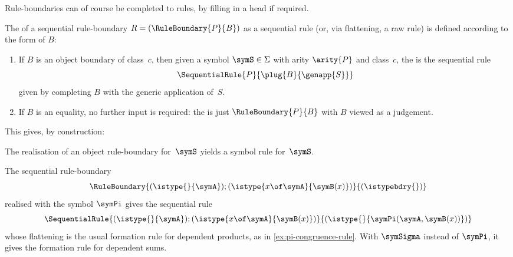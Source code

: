 Rule-boundaries can of course be completed to rules, by filling in a head if required.

\begin{definition}
  \label{def:rule-boundary-realisation}%
  The  of a sequential rule-boundary $R = (\RuleBoundary{P}{B})$ as a sequential rule (or, via flattening, a raw rule) is
  defined according to the form of $B$:
  \begin{enumerate}
  \item
    If $B$ is an object boundary of class~$c$, then given a symbol $\symS \in \Sigma$ with arity $\arity{P}$ and class~$c$, the  is the sequential rule
    \begin{equation*}
      \SequentialRule
      {P}
      {\plug{B}{\genapp{S}}}
    \end{equation*}
    given by completing $B$ with the generic application of~$S$.

    \item
    If $B$ is an equality, no further input is required: the  is just $\RuleBoundary{P}{B}$ with $B$ viewed as a judgement.
\end{enumerate}
\end{definition}

This gives, by construction:

\begin{propositionwithqed}
  The realisation of an object rule-boundary for~$\symS$ yields a symbol rule for~$\symS$.
\end{propositionwithqed}

\begin{example}
  The sequential rule-boundary
  \begin{equation*}
    \RuleBoundary{
      (\istype{}{\symA}) ;
      (\istype{x \of \symA}{\symB(x)})
    }{
      (\istypebdry{})
    }
  \end{equation*}
  realised with the symbol $\symPi$ gives the sequential rule
  \begin{equation*}
    \SequentialRule{
      (\istype{}{\symA}) ;
      (\istype{x \of \symA}{\symB(x)})
    }{
      (\istype{}{\symPi(\symA, \symB(x))})
    }
  \end{equation*}
  whose flattening is the usual formation rule for dependent products, as in \cref{ex:pi-congruence-rule}.
  With $\symSigma$ instead of $\symPi$, it gives the formation rule for dependent sums.
\end{example}

